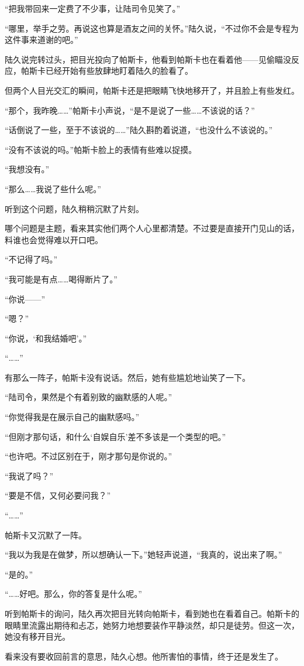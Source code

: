 “把我带回来一定费了不少事，让陆司令见笑了。”

“哪里，举手之劳。再说这也算是酒友之间的关怀。”陆久说，“不过你不会是专程为这件事来道谢的吧。”

陆久说完转过头，把目光投向了帕斯卡，他看到帕斯卡也在看着他——见偷瞄没反应，帕斯卡已经开始有些放肆地盯着陆久的脸看了。

但两个人目光交汇的瞬间，帕斯卡还是把眼睛飞快地移开了，并且脸上有些发红。

“那个，我昨晚……”帕斯卡小声说，“是不是说了一些……不该说的话？”

“话倒说了一些，至于不该说的……”陆久斟酌着说道，“也没什么不该说的。”

“没有不该说的吗。”帕斯卡脸上的表情有些难以捉摸。

“我想没有。”

“那么……我说了些什么呢。”

听到这个问题，陆久稍稍沉默了片刻。

哪个问题是主题，看来其实他们两个人心里都清楚。不过要是直接开门见山的话，料谁也会觉得难以开口吧。

“不记得了吗。”

“我可能是有点……喝得断片了。”

“你说——”

“嗯？”

“你说，‘和我结婚吧’。”

“……”

有那么一阵子，帕斯卡没有说话。然后，她有些尴尬地讪笑了一下。

“陆司令，果然是个有着别致的幽默感的人呢。”

“你觉得我是在展示自己的幽默感吗。”

“但刚才那句话，和什么‘自娱自乐’差不多该是一个类型的吧。”

“也许吧。不过区别在于，刚才那句是你说的。”

“我说了吗？”

“要是不信，又何必要问我？” 

“……”

帕斯卡又沉默了一阵。

“我以为我是在做梦，所以想确认一下。”她轻声说道，“我真的，说出来了啊。”

“是的。”

“……好吧。那么，你的答复是什么呢。”

听到帕斯卡的询问，陆久再次把目光转向帕斯卡，看到她也在看着自己。帕斯卡的眼睛里流露出期待和忐忑，她努力地想要装作平静淡然，却只是徒劳。但这一次，她没有移开目光。

看来没有要收回前言的意思，陆久心想。他所害怕的事情，终于还是发生了。

